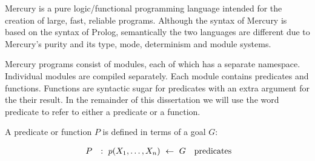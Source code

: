 

Mercury is a pure logic/functional programming language
intended for the creation of large, fast, reliable programs.
Although the syntax of Mercury is based on the syntax of Prolog,
semantically the two languages are different
due to Mercury's purity and its type, mode, determinism and module systems.

Mercury programs consist of modules,
each of which has a separate namespace.
Individual modules are compiled separately.
Each module contains predicates and functions.
Functions are syntactic sugar for predicates with an extra argument for the
their result.
In the remainder of this dissertation we will use the word predicate to
refer to either a predicate or a function.

A predicate or function $P$ is defined in terms of a goal $G$:

$$
\begin{array}{lll}
~P
    & :~ p(X_1, \ldots, X_n)~\leftarrow~G
        & \hbox{predicates} \\
\end{array}
$$


